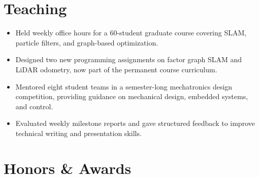 \documentclass{slate-resume}
\begin{document}
\section{Teaching}
\begin{entryblock}
\begin{itemize}
  \item Held weekly office hours for a 60-student graduate course covering SLAM, particle filters, and graph-based optimization.
  \item Designed two new programming assignments on factor graph SLAM and LiDAR odometry, now part of the permanent course curriculum.
\end{itemize}
\end{entryblock}
\entrygap
\begin{entryblock}
\begin{itemize}
  \item Mentored eight student teams in a semester-long mechatronics design competition, providing guidance on mechanical design, embedded systems, and control.
  \item Evaluated weekly milestone reports and gave structured feedback to improve technical writing and presentation skills.
\end{itemize}
\end{entryblock}

\section{Honors \& Awards}
\begin{entryblock}
\end{entryblock}
\entrygap
\begin{entryblock}
\end{entryblock}
\entrygap
\begin{entryblock}
\end{entryblock}
\entrygap
\begin{entryblock}
\end{entryblock}
\end{document}
